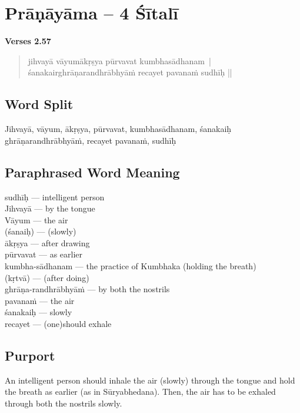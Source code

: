 \section*{Prāṇāyāma -- 4 Śītalī}

\noindent \textbf{Verses 2.57}

\begin{verse}
jihvayā vāyumākṛṣya pūrvavat kumbhasādhanam |\\
śanakairghrāṇarandhrābhyāṁ recayet pavanaṁ sudhīḥ ||
\end{verse}

\subsection*{Word Split}

Jihvayā, vāyum, ākṛṣya, pūrvavat, kumbhasādhanam, śanakaiḥ ghrāṇarandhrābhyāṁ, recayet pavanaṁ, sudhīḥ

\subsection*{Paraphrased Word Meaning}
\vspace{-10pt}

\begin{multicols}{2}
sudhīḥ --- intelligent person \\
Jihvayā --- by the tongue \\
Vāyum --- the air \\
(śanaiḥ) --- (slowly)\\
ākṛṣya --- after drawing \\
pūrvavat --- as earlier \\
kumbha-sādhanam --- the practice of Kumbhaka (holding the breath)\\
(kṛtvā) --- (after doing)\\
ghrāṇa-randhrābhyāṁ --- by both the nostrils \\
pavanaṁ --- the air \\
śanakaiḥ --- slowly \\
recayet --- (one)should exhale
\end{multicols}

\subsection*{Purport}


An intelligent person should inhale the air (slowly) through the tongue and hold the breath as earlier (as in Sūryabhedana). Then, the air has to be exhaled through both the nostrils slowly.

